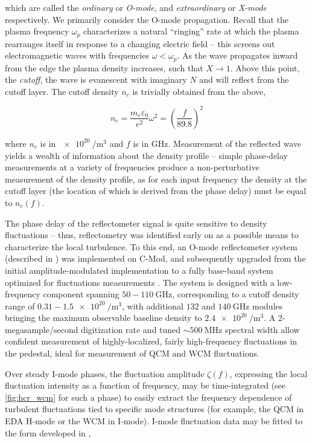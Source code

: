 \noindent which are called the \emph{ordinary} or \emph{O-mode}, and \emph{extraordinary} or \emph{X-mode} respectively.  We primarily consider the O-mode propagation.  Recall that the plasma frequency $\omega_p$ characterizes a natural ``ringing'' rate at which the plasma rearranges itself in response to a changing electric field -- this screens out electromagnetic waves with frequencies $\omega < \omega_p$.  As the wave propagates inward from the edge the plasma density increases, such that $X \rightarrow 1$.  Above this point, the \emph{cutoff}, the wave is evanescent with imaginary $N$ and will reflect from the cutoff layer.  The cutoff density $n_c$ is trivially obtained from the above,

\begin{equation}\label{eq:n_cutoff}
 n_c = \frac{m_e \varepsilon_0}{e^2} \omega^2 = \left(\frac{f}{89.8}\right)^2
\end{equation}

\noindent where $n_c$ is in $\SI{e20}{\per\meter\cubed}$ and $f$ is in $\si{\giga\hertz}$.  Measurement of the reflected wave yields a wealth of information about the density profile -- simple phase-delay measurements at a variety of frequencies produce a non-perturbative measurement of the density profile, as for each input frequency the density at the cutoff layer (the location of which is derived from the phase delay) must be equal to $n_c(f)$.

The phase delay of the reflectometer signal is quite sensitive to density fluctuations -- thus, reflectometry was identified early on as a possible means to characterize the local turbulence.  To this end, an O-mode reflectometer system (described in \cite[\S 2.2]{Dominguez2012}) was implemented on C-Mod, and subsequently upgraded from the initial amplitude-modulated implementation to a fully base-band system optimized for fluctuations measurements \cite{Lin1999}.  The system is designed with a low-frequency component spanning $50-\SI{110}{\giga\hertz}$, corresponding to a cutoff density range of $0.31-\SI{1.5e20}{\per\meter\cubed}$, with additional $132$ and $\SI{140}{\giga\hertz}$ modules bringing the maximum observable baseline density to $\SI{2.4e20}{\per\meter\cubed}$.  A 2-megasample/second digitization rate and tuned $\sim \SI{500}{\mega\hertz}$ spectral width allow confident measurement of highly-localized, fairly high-frequency fluctuations in the pedestal, ideal for measurement of QCM and WCM fluctuations.

Over steady I-mode phases, the fluctuation amplitude $\zeta(f)$, expressing the local fluctuation intensity as a function of frequency, may be time-integrated (see \cref{fig:hcr_wcm} for such a phase) to easily extract the frequency dependence of turbulent fluctuations tied to specific mode structures (for example, the QCM in EDA H-mode or the WCM in I-mode).  I-mode fluctuation data may be fitted to the form developed in \cite[\S 3]{Dominguez2012},

